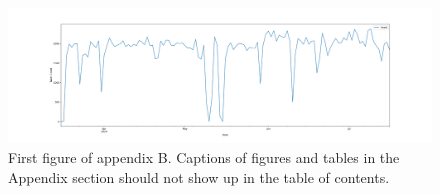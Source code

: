 \begin{figure}[ht]
\centering
\includegraphics[scale=0.22]{Figs/Fig2.png}
\caption{First figure of appendix B. Captions of figures and tables in the Appendix section should not show up in the table of contents.}
\label{fig:figure3AP}
\end{figure}



